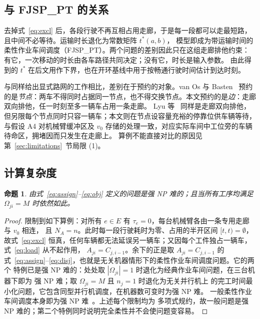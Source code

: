\documentclass[manuscript,screen,review]{acmart}
\newtheorem{prop}{命题}
\begin{document}
\subsection{与 FJSP\_PT 的关系}
\label{sec:fjsppt}

去掉式~\eqref{eq:excl} 后，各段行驶不再互相占用走廊，于是每一段都可以走最短路，且中间不必等待。运输时长退化为常数矩阵 $t^{*}(a,b)$，
模型即成为带运输时间的柔性作业车间调度（FJSP\_PT）。两个问题的差别因此只在这组走廊排他约束：有它，一次移动的时长由各车路径共同决定；没有它，时长是输入参数。
由此得到的 $t^{*}$ 在后文用作下界，也在开环基线中用于按畅通行驶时间估计到达时刻。

与同样给出显式路网的工作相比，差别在于预约的对象。van Os 与 Basten~\cite{vanos2026exact}
预约的是\emph{节点}：两车不得同时占据同一节点，也不得交换节点。本文预约的是\emph{边}：走廊双向排他，任一时刻至多一辆车占用一条走廊。
Lyu 等~\cite{lyu2019approach} 同样是走廊双向排他，但另限每个节点同时只容一辆车；本文则在节点设容量充裕的停靠位供车辆等待，与假设 A4 对机械臂缓冲区及 $v_0$ 存储的处理一致，对应实际车间中工位旁的车辆待命区，拥堵因而只发生在走廊上。
算例不能直接对比的原因见第~\ref{sec:limitations}~节局限 (1)。

\subsection{计算复杂度}

\begin{prop}
\label{prop:np_hard}
由式~\eqref{eq:assign}--\eqref{eq:obj} 定义的问题是强 NP 难的；且当所有工序均满足
$\Omega_{ji}=M$ 时依然如此。
\end{prop}

\begin{proof}
限制到如下算例：对所有 $e\in E$ 有 $\tau_e=0$，每台机械臂各由一条专用走廊与 $v_0$ 相连，
且 $N_A=n$。此时每一段行驶耗时为零、占用的半开区间 $[t,t)=\emptyset$，故式~\eqref{eq:excl}
恒真，任何车辆都无法延误另一辆车；又因每个工件独占一辆车，式~\eqref{eq:load} 从不起作用，
$A_{ji}=C_{j,i-1}$。余下的正是取 $A_{ji}=C_{j,i-1}$ 的
式~\eqref{eq:assign}--\eqref{eq:disj}，也就是无关机器情形下的柔性作业车间调度问题。它的两个
特例已是强 NP 难的：处处取 $|\Omega_{ji}|=1$ 时退化为经典作业车间问题，在三台机器下即为
强 NP 难；取 $\Omega_{ji}=M$ 且 $n_j=1$ 时退化为无关并行机上
的完工时间最小化问题，它包含同型并行机调度，在机器数可变时为强 NP 难。
一般柔性作业车间调度本身即为强 NP 难~\cite{dauzereperes2024fjsp}。上述每个限制均为
多项式规约，故一般问题是强 NP 难的；第二个特例同时说明完全柔性并不会使问题变容易。
\end{proof}
\end{document}
